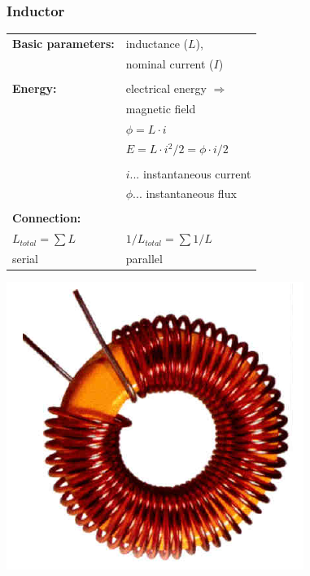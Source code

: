 \documentclass{beamer}
\begin{document}
	\begin{frame}
    \frametitle{Inductor}
		\begin{center}
		\begin{tabular}{l l}
			\textbf{Basic parameters:} 	& inductance ($L$),\\
																	& nominal current ($I$)\\ \\ \hline
			\textbf{Energy:}						& electrical energy $\Rightarrow$\\
																	& magnetic field\\
																	& $\phi = L\cdot i$\\
																	& $E = L\cdot i^2/ 2 = \phi \cdot i/2$\\\\
																	& $i$... instantaneous current\\
																	& $\phi$... instantaneous flux\\\\ \hline
		  \textbf{Connection:}				& \\
			$L_{total}= \sum{L}$				& $1/L_{total}= \sum{1/L}$\\
			serial											& parallel
		\end{tabular}
		\includegraphics[scale=0.2]{obr08_civka.png}
		\end{center}
  \end{frame}
\end{document}
